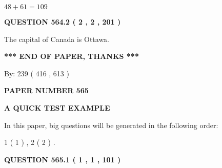 \documentclass[12pt]{article}
\begin{document}
$ %
48 +  %
61=   %
109$
 
 
  
\vspace{0.2in}
  
{\textbf{\Large{QUESTION
564.2 
 ( 2 , 2 , 201 )
}}}
  
  
 
 
\noindent{}
 
 
The capital of Canada is Ottawa.
 
 
 
 
   
   
 \vspace{0.2in}
 
   
   
   
   
\vspace{1.0in} 
{\textbf{\large{ *** END OF PAPER, THANKS *** }}} 
   
   
\hspace{1.0in} By: 
 239 ( 416 ,  613 )
   
   
   
   
\newpage 
\setcounter{page}{ 
   565001 } 
   
   
   
   
 {\textbf{ \Large{ PAPER NUMBER  565  }}}
   
   
\vspace{0.2in}
   
   
   
   
   
   
 \vspace{0.2in}
{\LARGE {\textbf{ A QUICK TEST EXAMPLE}}}
   
   
   
\vspace{0.2in}
   
In this paper, big questions will be generated in the following order: 
   
   
   1 ( 1 )
 ,
   2 ( 2 )
 .
  
\vspace{0.2in}
  
{\textbf{\Large{QUESTION
565.1 
 ( 1 , 1 , 101 )
}}}
  
  
 
 
\noindent{}
\end{document}
